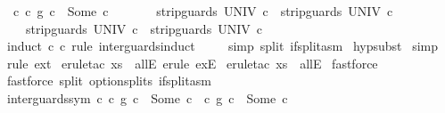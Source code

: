 \begin{isabellebody}
\ \ {\isachardoublequoteopen}{\isasymAnd}c{\isachardot}\ {\isacharparenleft}c{}\ {\isasyminter}\isactrlsub g\ c{}{\isacharparenright}\ {\isacharequal}\ Some\ c\ \ {\isasymLongrightarrow}\ \isanewline
\ \ \ \ {\isacharparenleft}strip{\isacharunderscore}guards\ UNIV\ c\ {\isacharequal}\ strip{\isacharunderscore}guards\ UNIV\ c{}{\isacharparenright}\ {\isasymand}\ \isanewline
\ \ \ \ {\isacharparenleft}strip{\isacharunderscore}guards\ UNIV\ c\ {\isacharequal}\ strip{\isacharunderscore}guards\ UNIV\ c{}{\isacharparenright}{\isachardoublequoteclose}\isanewline
%
\isadelimproof
%
\endisadelimproof
%
\isatagproof
{}\isamarkupfalse%
\ {\isacharparenleft}induct\ c{}\ c{}\ rule{\isacharcolon}\ inter{\isacharunderscore}guards{\isachardot}induct{\isacharparenright}\ \isanewline
{}\isamarkupfalse%
\ {}\ \isanewline
{}\isamarkupfalse%
\ {\isacharparenleft}simp\ split{\isacharcolon}\ if{\isacharunderscore}split{\isacharunderscore}asm{\isacharparenright}\isanewline
{}\isamarkupfalse%
\ hypsubst\isanewline
{}\isamarkupfalse%
\ simp\isanewline
{}\isamarkupfalse%
\ {\isacharparenleft}rule\ ext{\isacharparenright}\isanewline
{}\isamarkupfalse%
\ {\isacharparenleft}erule{\isacharunderscore}tac\ x{\isacharequal}s\ \ allE{\isacharcomma}\ erule\ exE{\isacharparenright}\isanewline
{}\isamarkupfalse%
\ {\isacharparenleft}erule{\isacharunderscore}tac\ x{\isacharequal}s\ \ allE{\isacharparenright}\isanewline
{}\isamarkupfalse%
\ fastforce\isanewline
{}\isamarkupfalse%
\ {\isacharparenleft}fastforce\ split{\isacharcolon}\ option{\isachardot}splits\ if{\isacharunderscore}split{\isacharunderscore}asm{\isacharparenright}{\isacharplus}\isanewline
{}\isamarkupfalse%
%
\endisatagproof
{\isafoldproof}%
%
\isadelimproof
\isanewline
%
\endisadelimproof
\isanewline
{}\isamarkupfalse%
\ inter{\isacharunderscore}guards{\isacharunderscore}sym{\isacharcolon}\ {\isachardoublequoteopen}{\isasymAnd}c{\isachardot}\ {\isacharparenleft}c{}\ {\isasyminter}\isactrlsub g\ c{}{\isacharparenright}\ {\isacharequal}\ Some\ c\ {\isasymLongrightarrow}\ {\isacharparenleft}c{}\ {\isasyminter}\isactrlsub g\ c{}{\isacharparenright}\ {\isacharequal}\ Some\ c{\isachardoublequoteclose}\isanewline
%
\isadelimproof
%
\endisadelimproof
%
\isatagproof
{}\isamarkupfalse%

\end{isabellebody}
